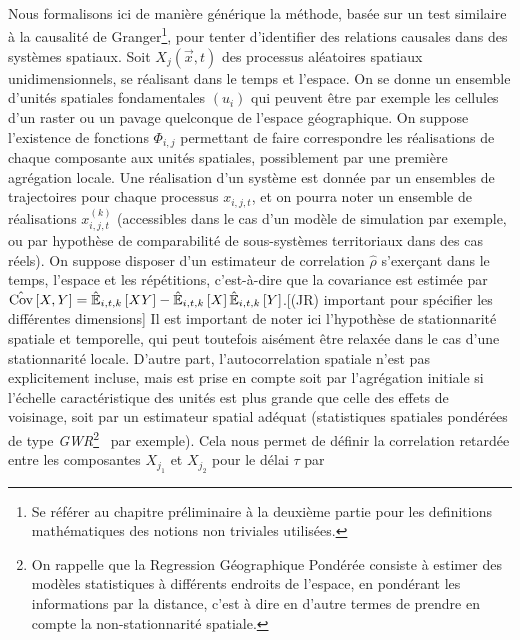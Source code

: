 {Nous formalisons ici de manière générique la méthode, basée sur un test similaire à la causalité de Granger\footnote{Se référer au chapitre préliminaire à la deuxième partie pour les definitions mathématiques des notions non triviales utilisées.}, pour tenter d'identifier des relations causales dans des systèmes spatiaux. Soit $X_j(\vec{x},t)$ des processus aléatoires spatiaux unidimensionnels, se réalisant dans le temps et l'espace. On se donne un ensemble d'unités spatiales fondamentales $(u_i)$ qui peuvent être par exemple les cellules d'un raster ou un pavage quelconque de l'espace géographique. On suppose l'existence de fonctions $\Phi_{i,j}$ permettant de faire correspondre les réalisations de chaque composante aux unités spatiales, possiblement par une première agrégation locale. Une réalisation d'un système est donnée par un ensembles  de trajectoires pour chaque processus $x_{i,j,t}$, et on pourra noter un ensemble de réalisations $x^{(k)}_{i,j,t}$ (accessibles dans le cas d'un modèle de simulation par exemple, ou par hypothèse de comparabilité de sous-systèmes territoriaux dans des cas réels). On suppose disposer d'un estimateur de correlation $\hat{\rho}$ s'exerçant dans le temps, l'espace et les répétitions, c'est-à-dire que la covariance est estimée par $\hat{\operatorname{Cov}}\left[X,Y\right] = \hat{\mathbb{E}}_{i,t,k}\left[XY\right] - \hat{\mathbb{E}}_{i,t,k}\left[X\right]\hat{\mathbb{E}}_{i,t,k}\left[Y\right]$.[(JR) important pour spécifier les différentes dimensions] Il est important de noter ici l'hypothèse de stationnarité spatiale et temporelle, qui peut toutefois aisément être relaxée dans le cas d'une stationnarité locale. D'autre part, l'autocorrelation spatiale n'est pas explicitement incluse, mais est prise en compte soit par l'agrégation initiale si l'échelle caractéristique des unités est plus grande que celle des effets de voisinage, soit par un estimateur spatial adéquat (statistiques spatiales pondérées de type \emph{GWR}\footnote{On rappelle que la Regression Géographique Pondérée consiste à estimer des modèles statistiques à différents endroits de l'espace, en pondérant les informations par la distance, c'est à dire en d'autre termes de prendre en compte la non-stationnarité spatiale.}~\cite{brunsdon1998geographically} par exemple). Cela nous permet de définir la correlation retardée entre les composantes $X_{j_1}$ et $X_{j_2}$ pour le délai $\tau$ par
}



